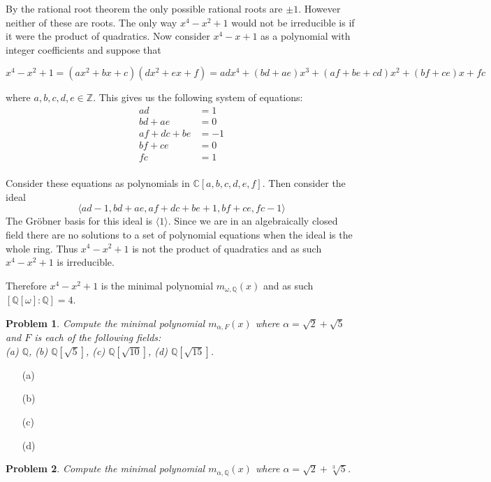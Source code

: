 \documentclass[10pt]{article}
\newcommand{\sk}{\vskip 10mm}
\newcommand{\bb}[1]{\mathbb{#1}}
\theoremstyle{plain}
\newtheorem{problem}{Problem}
\theoremstyle{remark}
\begin{document}
By the rational root theorem the only possible rational roots are $\pm 1$.
However neither of these are roots. The only way $x^4-x^2+1$ would not
be irreducible is if it were the product of quadratics. Now consider
$x^4-x+1$ as a polynomial with integer coefficients and suppose that

\[x^4-x^2+1 = (ax^2+bx+c)(dx^2+ex+f)=adx^4+(bd+ae)x^3+(af+be+cd)x^2+(bf+ce)x+fc\]

where $a,b,c,d,e\in\bb{Z}$. This gives us the following system of equations:
\begin{align*}
  ad &=1\\
  bd+ae &= 0\\
  af+dc+be &= -1\\
  bf+ce &=0 \\
  fc &= 1\\
\end{align*}

Consider these equations as polynomials in $\bb{C}[a,b,c,d,e,f]$. Then
consider the ideal
\[ \langle ad-1,bd+ae,af+dc+be+1,bf+ce,fc-1\rangle \]
The Gr\"obner basis for this ideal is $\langle 1\rangle$. Since we are in an algebraically
closed field there are no solutions to a set of polynomial equations when
the ideal is the whole ring. Thus $x^4-x^2+1$ is not the product of quadratics
and as such $x^4-x^2+1$ is irreducible.

Therefore $x^4-x^2+1$ is the minimal polynomial $m_{\omega,\bb{Q}}(x)$ and as such
$[\bb{Q}[\omega]:\bb{Q}]=4$.

\begin{problem}
  Compute the minimal polynomial $m_{\alpha,F}(x)$ where
  $\alpha = \sqrt{2} + \sqrt{5}$ and $F$ is each of the following fields:\\
  (a) $\mathbb{Q}$, \hspace{1cm} (b)
  $\mathbb{Q}[\sqrt{5}]$, \hspace{1cm} (c) $\mathbb{Q}[\sqrt{10}]$,
  \hspace{1cm} (d) $\mathbb{Q}[\sqrt{15}]$.
\end{problem}

\begin{enumerate}
\item[(a)]
\item[(b)]
\item[(c)]
\item[(d)]
\end{enumerate}

\sk

\begin{problem}
  Compute the minimal polynomial $m_{\alpha, \mathbb{Q}}(x)$
  where $\alpha = \sqrt{2} + \sqrt[3]{5}$.
\end{problem}
\end{document}
